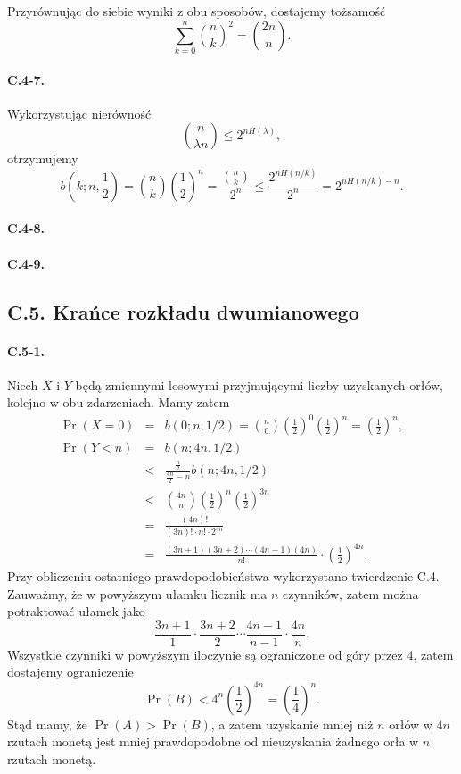 Przyrównując do siebie wyniki z obu sposobów, dostajemy tożsamość
\[
	\sum_{k=0}^n\binom{n}{k}^2 = \binom{2n}{n}.
\]

\paragraph{C.4-7.}
Wykorzystując nierówność
\[
	\binom{n}{\lambda n}\le 2^{nH(\lambda)},
\]
otrzymujemy
\[
	b\left(k;n,\frac{1}{2}\right) = \binom{n}{k}\left(\frac{1}{2}\right)^n = \frac{\binom{n}{k}}{2^n}\le\frac{2^{nH(n/k)}}{2^n} = 2^{nH(n/k)-n}.
\]

\paragraph{C.4-8.}
\paragraph{C.4-9.}

\subsection*{C.5. Krańce rozkładu dwumianowego}

\paragraph{C.5-1.}
Niech $X$ i $Y$ będą zmiennymi losowymi przyjmującymi liczby uzyskanych orłów, kolejno w obu zdarzeniach. Mamy zatem
\begin{eqnarray*}
	\Pr(X=0) &=& b(0;n,1/2) = \binom{n}{0}\left(\frac{1}{2}\right)^0\left(\frac{1}{2}\right)^n = \left(\frac{1}{2}\right)^n, \\
	\Pr(Y<n) &=& b(n;4n,1/2) \\
	&<& \frac{\frac{n}{2}}{\frac{4n}{2}-n}b(n;4n,1/2) \\
	&<& \binom{4n}{n}\left(\frac{1}{2}\right)^n\left(\frac{1}{2}\right)^{3n} \\
	&=& \frac{(4n)!}{(3n)!\cdot n!\cdot 2^{4n}} \\
	&=& \frac{(3n+1)(3n+2)\cdots(4n-1)(4n)}{n!}\cdot\left(\frac{1}{2}\right)^{4n}.
\end{eqnarray*}
Przy obliczeniu ostatniego prawdopodobieństwa wykorzystano twierdzenie C.4. Zauważmy, że w powyższym ułamku licznik ma $n$ czynników, zatem można potraktować ułamek jako
\[
	\frac{3n+1}{1}\cdot\frac{3n+2}{2}\cdots\frac{4n-1}{n-1}\cdot\frac{4n}{n}.
\]
Wszystkie czynniki w powyższym iloczynie są ograniczone od góry przez $4$, zatem dostajemy ograniczenie
\[
	\Pr(B) < 4^n\left(\frac{1}{2}\right)^{4n} = \left(\frac{1}{4}\right)^n.
\]
Stąd mamy, że $\Pr(A)>\Pr(B)$, a zatem uzyskanie mniej niż $n$ orłów w $4n$ rzutach monetą jest mniej prawdopodobne od nieuzyskania żadnego orła w $n$ rzutach monetą.

